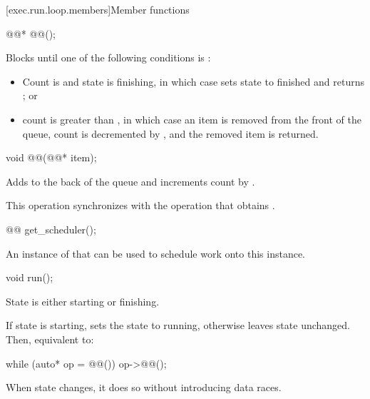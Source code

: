 [exec.run.loop.members]{Member functions}

\begin{itemdecl}
@@* @@();
\end{itemdecl}

\begin{itemdescr}
\pnum
\effects
Blocks until one of the following conditions is :
\begin{itemize}
\item
Count is  and state is finishing,
in which case  sets state to finished
and returns ; or
\item
count is greater than ,
in which case an item is removed from the front of the queue,
count is decremented by , and
the removed item is returned.
\end{itemize}
\end{itemdescr}

\begin{itemdecl}
void @@(@@* item);
\end{itemdecl}

\begin{itemdescr}
\pnum
\effects
Adds  to the back of the queue and
increments count by .

\pnum
\sync
This operation synchronizes with
the  operation that obtains .
\end{itemdescr}

%
\begin{itemdecl}
@@ get_scheduler();
\end{itemdecl}

\begin{itemdescr}
\pnum
\returns
An instance of 
that can be used to schedule work onto this  instance.
\end{itemdescr}

%
\begin{itemdecl}
void run();
\end{itemdecl}

\begin{itemdescr}
\pnum
\expects
State is either starting or finishing.

\pnum
\effects
If state is starting,
sets the state to running,
otherwise leaves state unchanged.
Then, equivalent to:
\begin{codeblock}
while (auto* op = @@()) {
  op->@@();
}
\end{codeblock}

\pnum
\remarks
When state changes, it does so without introducing data races.
\end{itemdescr}

